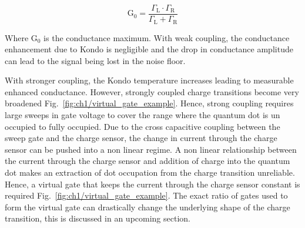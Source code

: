 \begin{equation}\label{eq:cond_amp}
  \mathrm{G_0} = 
  \frac
  {\Gamma_\mathrm{L}\cdot\Gamma_\mathrm{R}}
  {\Gamma_\mathrm{L} + \Gamma_\mathrm{R}}
\end{equation}

Where $\mathrm{G_0}$ is the conductance maximum. With weak coupling, the conductance enhancement due to Kondo is negligible and the drop in conductance amplitude can  lead to the signal being lost in the noise floor. 

With stronger coupling, the Kondo temperature increases leading to measurable enhanced conductance. However, strongly coupled charge transitions become very broadened Fig.~\ref{fig:ch1/virtual_gate_example}. Hence, strong coupling requires large sweeps in gate voltage to cover the range where the quantum dot is un occupied to fully occupied. Due to the cross capacitive coupling between the sweep gate and the charge sensor, the change in current through the charge sensor can be pushed into a non linear regime. A non linear relationship between the current through the charge sensor and addition of charge into the quantum dot makes an extraction of dot occupation from the charge transition unreliable. Hence, a virtual gate that keeps the current through the charge sensor constant is required Fig.~\ref{fig:ch1/virtual_gate_example}. The exact ratio of gates used to form the virtual gate can drastically change the underlying shape of the charge transition, this is discussed in an upcoming section.   


